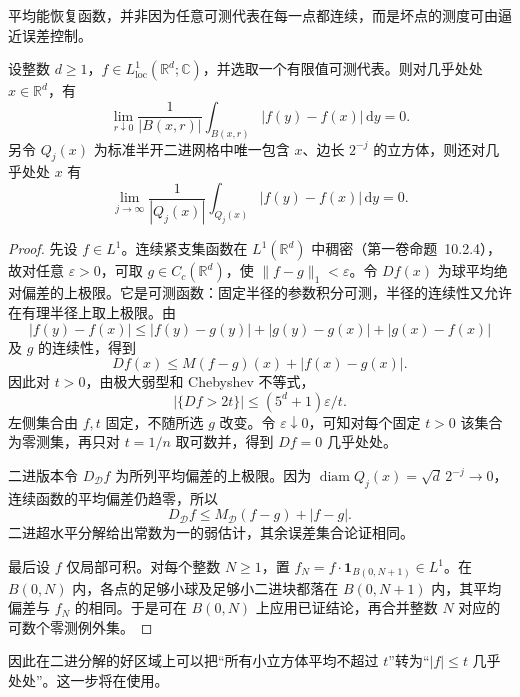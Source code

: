 平均能恢复函数，并非因为任意可测代表在每一点都连续，而是坏点的测度可由逼近误差控制。
\begin{proposition}\label{b2:thm:17-differentiation}
设整数 \(d\geq1\)，\(f\in L^1_{\mathrm{loc}}(\mathbb R^d;\mathbb C)\)，并选取一个有限值可测代表。则对几乎处处 \(x\in\mathbb R^d\)，有
\[
 \lim_{r\downarrow0}\dfrac1{|B(x,r)|}\int_{B(x,r)}|f(y)-f(x)|\,\mathrm dy=0.
\]
另令 \(Q_j(x)\) 为标准半开二进网格中唯一包含 \(x\)、边长 \(2^{-j}\) 的立方体，则还对几乎处处 \(x\) 有
\[\lim_{j\to\infty}\frac1{|Q_j(x)|}\int_{Q_j(x)}|f(y)-f(x)|\,\mathrm dy=0.\]
\end{proposition}
\begin{proof}
先设 \(f\in L^1\)。连续紧支集函数在 \(L^1(\mathbb R^d)\) 中稠密（第一卷命题~10.2.4），故对任意 \(\varepsilon>0\)，可取 \(g\in C_c(\mathbb R^d)\)，使 \(\|f-g\|_1<\varepsilon\)。令 \(Df(x)\) 为球平均绝对偏差的上极限。它是可测函数：固定半径的参数积分可测，半径的连续性又允许在有理半径上取上极限。由
\[
 |f(y)-f(x)|\leq |f(y)-g(y)|
       +|g(y)-g(x)|+|g(x)-f(x)|
\]
及 \(g\) 的连续性，得到
\[Df(x)\leq M(f-g)(x)+|f(x)-g(x)|.\]
因此对 \(t>0\)，由极大弱型和 Chebyshev 不等式，
\[
 |\{Df>2t\}|\leq(5^d+1)\varepsilon/t.
\]
左侧集合由 \(f,t\) 固定，不随所选 \(g\) 改变。令 \(\varepsilon\downarrow0\)，可知对每个固定 \(t>0\) 该集合为零测集，再只对 \(t=1/n\) 取可数并，得到 \(Df=0\) 几乎处处。

二进版本令 \(D_{\mathcal D}f\) 为所列平均偏差的上极限。因为 \(\operatorname{diam}Q_j(x)=\sqrt d\,2^{-j}\to0\)，连续函数的平均偏差仍趋零，所以
\[D_{\mathcal D}f\leq M_{\mathcal D}(f-g)+|f-g|.\]
二进超水平分解给出常数为一的弱估计，其余误差集合论证相同。

最后设 \(f\) 仅局部可积。对每个整数 \(N\geq1\)，置 \(f_N=f\cdot\mathbf1_{B(0,N+1)}\in L^1\)。在 \(B(0,N)\) 内，各点的足够小球及足够小二进块都落在 \(B(0,N+1)\) 内，其平均偏差与 \(f_N\) 的相同。于是可在 \(B(0,N)\) 上应用已证结论，再合并整数 \(N\) 对应的可数个零测例外集。
\end{proof}
因此在二进分解的好区域上可以把“所有小立方体平均不超过 \(t\)”转为“\(|f|\leq t\) 几乎处处”。这一步将在使用。
